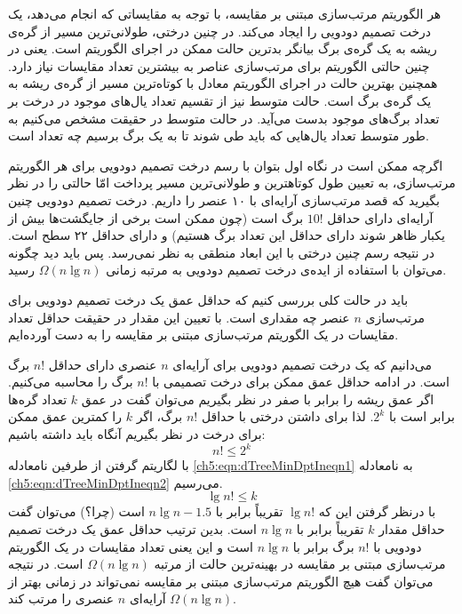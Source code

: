 هر الگوریتم مرتب‌سازی مبتنی بر مقایسه، با توجه به مقایساتی که انجام می‌دهد، یک درخت تصمیم دودویی را ایجاد می‌کند. در چنین درختی، طولانی‌ترین مسیر از گره‌ی ریشه به یک گره‌ی برگ بیانگر بدترین حالت ممکن در اجرای الگوریتم است. یعنی در چنین حالتی الگوریتم برای مرتب‌سازی عناصر به بیشترین تعداد مقایسات نیاز دارد. همچنین بهترین حالت در اجرای الگوریتم معادل با کوتاه‌ترین مسیر از گره‌ی ریشه به یک گره‌ی برگ است. حالت متوسط نیز از تقسیم تعداد یال‌های موجود در درخت بر تعداد برگ‌های موجود بدست می‌آید. در حالت متوسط در حقیقت مشخص می‌کنیم  به طور متوسط تعداد یال‌هایی که باید طی شوند تا به یک برگ برسیم چه تعداد است.

اگرچه ممکن است در نگاه اول بتوان با رسم درخت تصمیم دودویی برای هر الگوریتم مرتب‌سازی، به تعیین طول کوتاهترین و طولانی‌ترین مسیر پرداخت امّا حالتی را در نظر بگیرید که قصد مرتب‌سازی آرایه‌ای با ۱۰ عنصر را داریم. درخت تصمیم دودویی چنین آرایه‌ای دارای حداقل {$10!$} برگ است (چون ممکن است برخی از جایگشت‌ها بیش از یکبار ظاهر شوند دارای حداقل این تعداد برگ هستیم) و دارای حداقل ۲۲ سطح است. در نتیجه رسم چنین درختی با این ابعاد منطقی به نظر نمی‌رسد. پس باید دید چگونه می‌توان با استفاده از ایده‌ی درخت تصمیم دودویی به مرتبه زمانی {$\Omega (n\lg n)$} رسید.

باید در حالت کلی بررسی کنیم که حداقل عمق یک درخت تصمیم دودویی برای مرتب‌سازی {$n$} عنصر چه مقداری است. با تعیین این مقدار در حقیقت حداقل تعداد مقایسات در یک الگوریتم مرتب‌سازی مبتنی بر مقایسه را به دست آورده‌ایم.

می‌دانیم که یک درخت تصمیم دودویی برای آرایه‌ای {$n$} عنصری دارای حداقل {$n!$} برگ است. در ادامه حداقل عمق ممکن برای درخت تصمیمی با {$n!$} برگ را محاسبه می‌کنیم. اگر عمق ریشه را برابر با صفر در نظر بگیریم می‌توان گفت در عمق {$k$} تعداد گره‌ها برابر است با {$2^{k}$}. لذا برای داشتن درختی با حداقل {$n!$} برگ، اگر {$k$} را کمترین عمق ممکن برای درخت در نظر بگیریم آنگاه باید داشته باشیم:
\begin{equation}
n!\leq 2^{k}\label{ch5:eqn:dTreeMinDptIneqn1}
\end{equation}
با لگاریتم گرفتن از طرفین نامعادله {\eqref{ch5:eqn:dTreeMinDptIneqn1}} به نامعادله {\eqref{ch5:eqn:dTreeMinDptIneqn2}} می‌رسیم.
\begin{equation}
\lg n! \leq k\label{ch5:eqn:dTreeMinDptIneqn2}
\end{equation}
با درنظر گرفتن این که {$\lg n!$} تقریباً برابر با {$n\lg n -1.5$} است (چرا؟) می‌توان گفت حداقل مقدار {$k$}  تقریباً برابر با {$n\lg n$} است. بدین ترتیب حداقل عمق یک درخت تصمیم دودویی با {$n!$} برگ برابر با {$n\lg n$} است و این یعنی تعداد مقایسات در یک الگوریتم مرتب‌سازی مبتنی بر مقایسه در بهینه‌ترین حالت از مرتبه {$\Omega (n\lg n)$} است. در نتیجه می‌توان گفت هیچ الگوریتم مرتب‌سازی مبتنی بر مقایسه نمی‌تواند در زمانی بهتر از {$\Omega (n\lg n)$} آرایه‌ای {$n$} عنصری را مرتب کند.

